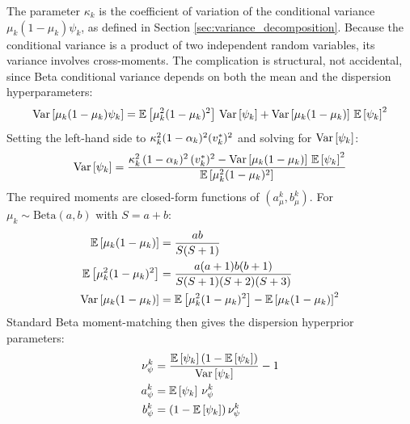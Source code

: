 The parameter $\kappa_k$ is the coefficient of variation of the conditional
variance $\mu_k(1-\mu_k)\psi_k$, as defined in Section
\ref{sec:variance_decomposition}. Because the conditional variance is a product
of two independent random variables, its variance involves cross-moments. The
complication is structural, not accidental, since Beta conditional variance
depends on both the mean and the dispersion hyperparameters:
\begin{equation}
  \text{Var}\left[\mu_k(1 - \mu_k)\psi_k\right]
  = \mathbb{E}\left[\mu_k^2(1 - \mu_k)^2\right]\,\text{Var}\left[\psi_k\right]
  + \text{Var}\left[\mu_k(1 - \mu_k)\right]\,\mathbb{E}\left[\psi_k\right]^2
\end{equation}
Setting the left-hand side to $\kappa_k^2 (1-\alpha_k)^2 (v^*_k)^2$ and solving
for $\text{Var}\left[\psi_k\right]$:
\begin{equation}
  \label{eq:app_bb_var_psi}
  \text{Var}\left[\psi_k\right]
  = \frac{\kappa_k^2\,(1-\alpha_k)^2\,(v^*_k)^2
          - \text{Var}\left[\mu_k(1-\mu_k)\right]\,\mathbb{E}\left[\psi_k\right]^2}
         {\mathbb{E}\left[\mu_k^2(1-\mu_k)^2\right]}
\end{equation}
The required moments are closed-form functions of $(a_\mu^k, b_\mu^k)$.
For $\mu_k \sim \text{Beta}(a,b)$ with $S = a + b$:
\begin{align}
  \mathbb{E}\left[\mu_k(1-\mu_k)\right] &= \frac{ab}{S(S+1)} \\
  \mathbb{E}\left[\mu_k^2(1-\mu_k)^2\right] &= \frac{a(a+1)b(b+1)}{S(S+1)(S+2)(S+3)} \\
  \text{Var}\left[\mu_k(1-\mu_k)\right] &= \mathbb{E}\left[\mu_k^2(1-\mu_k)^2\right] - \mathbb{E}\left[\mu_k(1-\mu_k)\right]^2
\end{align}
Standard Beta moment-matching then gives the dispersion hyperprior parameters:
\begin{align}
  \nu_\psi^k &= \frac{\mathbb{E}\left[\psi_k\right](1 - \mathbb{E}\left[\psi_k\right])}{\text{Var}\left[\psi_k\right]} - 1 \\
  a_\psi^k &= \mathbb{E}\left[\psi_k\right]\,\nu_\psi^k \\
  b_\psi^k &= (1 - \mathbb{E}\left[\psi_k\right])\,\nu_\psi^k
\end{align}

